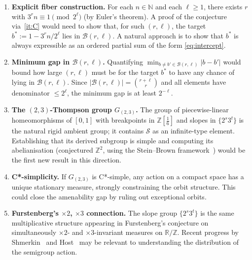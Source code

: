 \documentclass[12pt, a4paper]{amsart}
\theoremstyle{plain}
\theoremstyle{definition}
\theoremstyle{remark}
\newcommand{\N}{\mathbb{N}}
\newcommand{\Z}{\mathbb{Z}}
\newcommand{\R}{\mathbb{R}}
\newcommand{\Zs}{\Z[\tfrac{1}{6}]}
\begin{document}
\begin{enumerate}[leftmargin=*, label=\textbf{\arabic*.}]
  \item \textbf{Explicit fiber construction.}
        For each $n\in\N$ and each $\ell\geq 1$, there exists $r$ with
        $3^r n \equiv 1\pmod{2^\ell}$ (by Euler's theorem).  A proof
        of the conjecture via~\ref{it:C} would need to show that, for
        such $(r,\ell)$, the target $b^* := 1-3^r n/2^\ell$ lies in
        $\mathcal{B}(r,\ell)$.  A natural approach is to show that
        $b^*$ is always expressible as an ordered partial sum of the
        form \eqref{eq:intercept}.

  \item \textbf{Minimum gap in $\mathcal{B}(r,\ell)$.}
        Quantifying $\min_{b\neq b'\in\mathcal{B}(r,\ell)}|b-b'|$
        would bound how large $(r,\ell)$ must be for the target
        $b^*$ to have any chance of lying in $\mathcal{B}(r,\ell)$.
        Since $|\mathcal{B}(r,\ell)|=\binom{r+\ell}{r}$ and all
        elements have denominator $\leq 2^\ell$, the minimum gap
        is at least $2^{-\ell}$.

  \item \textbf{The $(2,3)$-Thompson group $G_{(2,3)}$.}
        The group of piecewise-linear homeomorphisms of $[0,1]$ with
        breakpoints in $\Zs$ and slopes in $\{2^s 3^t\}$ is the
        natural rigid ambient group; it contains $\mathcal{S}$ as an
        infinite-type element.  Establishing that its derived subgroup
        is simple and computing its abelianisation (conjectured $\Z^2$,
        using the Stein--Brown framework~\cite{Stein1992}) would be
        the first new result in this direction.

  \item \textbf{C*-simplicity.}
        If $G_{(2,3)}$ is C*-simple, any action on a compact space has
        a unique stationary measure, strongly constraining the orbit
        structure.  This could close the amenability gap by ruling out
        exceptional orbits.

  \item \textbf{Furstenberg's $\times 2$, $\times 3$ connection.}
        The slope group $\{2^s 3^t\}$ is the same multiplicative
        structure appearing in Furstenberg's conjecture on
        simultaneously $\times 2$- and $\times 3$-invariant measures
        on $\R/\Z$.  Recent progress by
        Shmerkin~\cite{Shmerkin2019} and Host~\cite{Host1995} may
        be relevant to understanding the distribution of the semigroup
        action.
\end{enumerate}
\end{document}

